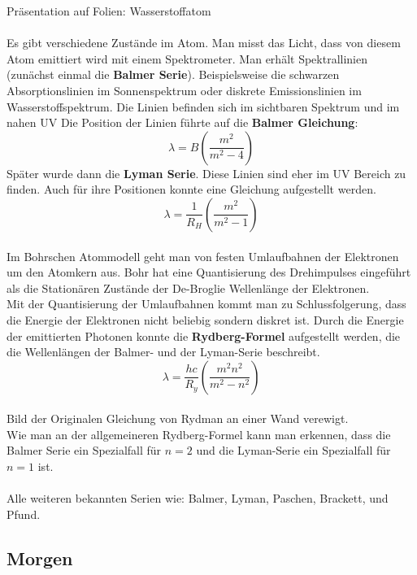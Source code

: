Präsentation auf Folien: Wasserstoffatom\\[5pt]
\\
Es gibt verschiedene Zustände im Atom. Man misst das Licht, dass von diesem Atom emittiert wird mit einem Spektrometer. Man erhält Spektrallinien (zunächst einmal die \textbf{Balmer Serie}). Beispielsweise die schwarzen Absorptionslinien im Sonnenspektrum oder diskrete Emissionslinien im Wasserstoffspektrum. Die Linien befinden sich im sichtbaren Spektrum und im nahen UV Die Position der Linien führte auf die \textbf{Balmer Gleichung}:
\begin{equation*}
\lambda = B \left(\frac{m^2}{m^2 - 4}\right)
\end{equation*}
Später wurde dann die \textbf{Lyman Serie}. Diese Linien sind eher im UV Bereich zu finden. Auch für ihre Positionen konnte eine Gleichung aufgestellt werden.
\begin{equation*}
\lambda = \frac{1}{R_H} \left(\frac{m^2}{m^2 - 1}\right)
\end{equation*}
\\
Im Bohrschen Atommodell geht man von festen Umlaufbahnen der Elektronen um den Atomkern aus. Bohr hat eine Quantisierung des Drehimpulses eingeführt als die Stationären Zustände der De-Broglie Wellenlänge der Elektronen.\\
Mit der Quantisierung der Umlaufbahnen kommt man zu Schlussfolgerung, dass die Energie der Elektronen nicht beliebig sondern diskret ist. Durch die Energie der emittierten Photonen konnte die \textbf{Rydberg-Formel} aufgestellt werden, die die Wellenlängen der Balmer- und der Lyman-Serie beschreibt.
\begin{equation*}
\lambda = \frac{h c}{R_{y}} \left(\frac{m^2 n^2}{m^2 - n^2}\right)
\end{equation*}
\\
Bild der Originalen Gleichung von Rydman an einer Wand verewigt.\\[10pt]
Wie man an der allgemeineren Rydberg-Formel kann man erkennen, dass die Balmer Serie ein Spezialfall für $ n = 2 $ und die Lyman-Serie ein Spezialfall für $ n = 1 $ ist.\\
\\
Alle weiteren bekannten Serien wie: Balmer, Lyman, Paschen, Brackett, und Pfund.

\subsection*{Morgen}

